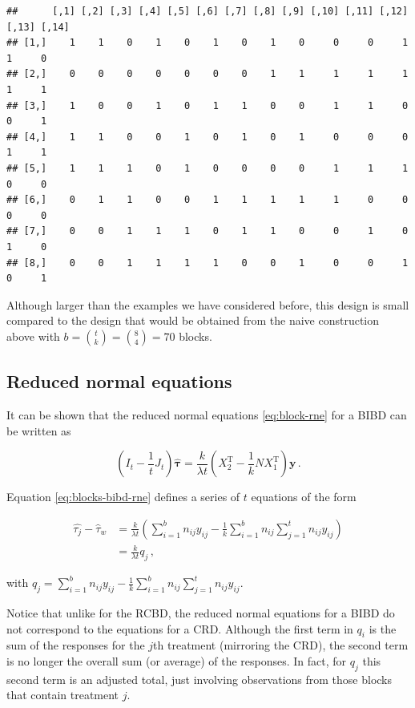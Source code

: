 \documentclass[
]{book}
\theoremstyle{definition}
\theoremstyle{definition}
\theoremstyle{definition}
\theoremstyle{definition}
\theoremstyle{remark}
\begin{document}
\begin{verbatim}
##      [,1] [,2] [,3] [,4] [,5] [,6] [,7] [,8] [,9] [,10] [,11] [,12] [,13] [,14]
## [1,]    1    1    0    1    0    1    0    1    0     0     0     1     1     0
## [2,]    0    0    0    0    0    0    0    1    1     1     1     1     1     1
## [3,]    1    0    0    1    0    1    1    0    0     1     1     0     0     1
## [4,]    1    1    0    0    1    0    1    0    1     0     0     0     1     1
## [5,]    1    1    1    0    1    0    0    0    0     1     1     1     0     0
## [6,]    0    1    1    0    0    1    1    1    1     1     0     0     0     0
## [7,]    0    0    1    1    1    0    1    1    0     0     1     0     1     0
## [8,]    0    0    1    1    1    1    0    0    1     0     0     1     0     1
\end{verbatim}

Although larger than the examples we have considered before, this design is small compared to the design that would be obtained from the naive construction above with \(b = {t \choose k} = {8 \choose 4} = 70\) blocks.

\hypertarget{reduced-normal-equations}{%
\subsection{Reduced normal equations}\label{reduced-normal-equations}}

It can be shown that the reduced normal equations \eqref{eq:block-rne} for a BIBD can be written as

\begin{equation}
\left(I_t - \frac{1}{t}J_t\right)\hat{\boldsymbol{\tau}} = \frac{k}{\lambda t}\left(X_2^{\mathrm{T}} - \frac{1}{k}NX_1^{\mathrm{T}}\right)\boldsymbol{y}\,.
\label{eq:blocks-bibd-rne}
\end{equation}

Equation \eqref{eq:blocks-bibd-rne} defines a series of \(t\) equations of the form

\begin{align*}
\hat{\tau_j} - \hat{\tau}_w & = \frac{k}{\lambda t}\left(\sum_{i = 1}^b n_{ij}y_{ij} - \frac{1}{k}\sum_{i=1}^bn_{ij}\sum_{j=1}^tn_{ij}y_{ij}\right) \\
& = \frac{k}{\lambda t} q_j\,,
\end{align*}

with \(q_j = \sum_{i = 1}^b n_{ij}y_{ij} - \frac{1}{k}\sum_{i=1}^bn_{ij}\sum_{j=1}^tn_{ij}y_{ij}\).

Notice that unlike for the RCBD, the reduced normal equations for a BIBD do not correspond to the equations for a CRD. Although the first term in \(q_i\) is the sum of the responses for the \(j\)th treatment (mirroring the CRD), the second term is no longer the overall sum (or average) of the responses. In fact, for \(q_j\) this second term is an adjusted total, just involving observations from those blocks that contain treatment \(j\).
\end{document}
